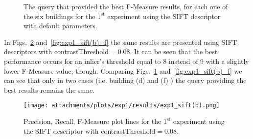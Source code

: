     	    \begin{figure}[ht!] %
        		\centering
        		
        		\caption{The query that provided the best F-Measure results, for each one of the six buildings for the $1^\text{st}$  experiment using the SIFT descriptor with default parameters.}
        		\label{fig:exp1_sift(a)_f}
    	    \end{figure}
    	    
    	    In Figs.~\ref{fig:exp1_sift_b} and~\ref{fig:exp1_sift(b)_f} the same results are presented using SIFT descriptors with contrastThreshold$=$0.08. It can be seen that the best performance occurs for an inlier's threshold equal to 8 instead of 9 with a slightly lower F-Measure value, though. Comparing Figs.~\ref{fig:exp1_sift(a)_f} and~\ref{fig:exp1_sift(b)_f} we can see that only in two cases (i.e. building (d) and (f) ) the query providing the best results remains the same.
    	    
    	    \newpage
    	    
            \begin{figure}[ht!]	%
              \centering
              \texttt{[image: attachments/plots/exp1/results/exp1\_sift(b).png]}
              \caption{Precision, Recall, F-Measure plot lines for the $1^\text{st}$  experiment using the SIFT descriptor with contrastThreshold$=$0.08.}
              \label{fig:exp1_sift_b}
            \end{figure}
  
